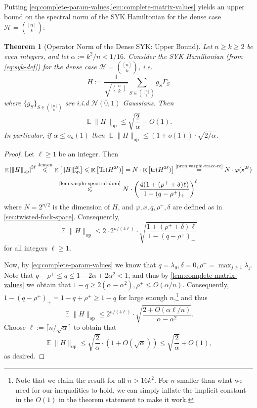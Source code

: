 \documentclass
[11pt,letterpaper]
{article}
\newtheorem{theorem}{Theorem}[section]
\theoremstyle{definition}
\newcommand{\cN}{\mathcal{N}}
\newcommand{\Tr}{\operatorname{Tr}}
\newcommand{\sfx}{\mathsf x}
\newcommand{\1}{\mathbf{1}}
\newcommand{\tr}{\mathrm{tr}}
\newcommand{\cH}{\mathcal H}
\DeclareMathOperator*{\E}{\mathbb{E}}
\renewcommand{\geq}{\geqslant}
\renewcommand{\leq}{\leqslant}
\begin{document}
Putting \cref{eq:complete-param-values,lem:complete-matrix-values} yields an upper bound on the spectral norm of the SYK Hamiltonian for the dense case $\cH = \binom{[n]}{k}$:
\begin{theorem}[Operator Norm of the Dense SYK: Upper Bound]\label{thm:syk-spectral-norm}
    Let $n\geq k\geq 2$ be even integers, and let $\alpha:= k^2/n < 1/16$. Consider the SYK Hamiltonian (from \cref{eq:syk-def}) for the dense case $\cH = \binom{[n]}{k}$, i.e.
    \[H:= \frac{1}{\sqrt{\binom{n}{k}}}\sum_{S\in\binom{[n]}{k}}g_S\Gamma_S\]
    where $\{g_S\}_{S\in\binom{[n]}{k}}$ are i.i.d $\cN(0, 1)$ Gaussians. Then 
    \[\E\|H\|_{\operatorname{op}}\leq \sqrt{\frac{2}{\alpha}} + O(1).\]
    In particular, if $\alpha\leq o_n(1)$ then $\E\|H\|_{\operatorname{op}}\leq (1 + o(1))\cdot\sqrt{2/\alpha}$.
\end{theorem}
\begin{proof}
    Let $\ell\geq 1$ be an integer. Then 
    \[\E\left[\|H\|_{\operatorname{op}}\right]^{2\ell}\overset{\text{Jensen}}{\leq}\E\left[\|H\|_{\operatorname{op}}^{2\ell}\right]\leq\E\left[\Tr(H^{2\ell})\right] = N\cdot\E\left[\tr(H^{2\ell})\right]\overset{\text{\cref{prop:varphi-trace-re}}}{=} N\cdot\varphi(\sfx^{2\ell})\] 
    \[\overset{\text{\cref{lem:varphi-spectral-dom}}}{\leq} N\cdot\left(\frac{4(1 + (\rho^+ + \delta)\ell)}{1 - (q - \rho^+)_+}\right)^\ell\]
    where $N = 2^{n/2}$ is the dimension of $H$, and $\varphi, x, q, \rho^+, \delta$ are defined as in \cref{sec:twisted-fock-space}. Consequently, 
    \[\E\|H\|_{\operatorname{op}}\leq 2\cdot 2^{n/(4\ell)}\cdot\sqrt{\frac{1 + (\rho^+ + \delta)\ell}{1 - (q - \rho^+)_+}}\]
    for all integers $\ell\geq 1$. 
    
    Now, by \cref{eq:complete-param-values} we know that $q = \lambda_0, \delta = 0, \rho^+ = \max_{j\geq 1}\lambda_j$. Note that $q - \rho^+\leq q\leq 1 - 2\alpha + 2\alpha^2 < 1$, and thus by \cref{lem:complete-matrix-values} we obtain that $1 - q\geq 2(\alpha - \alpha^2), \rho^+\leq O(\alpha/n)$. Consequently, $1 - (q - \rho^+)_+ = 1 - q + \rho^+\geq 1 - q$ for large enough $n$,\footnote{Note that we claim the result for all $n > 16k^2$. For $n$ smaller than what we need for our inequalities to hold, we can simply inflate the implicit constant in the $O(1)$ in the theorem statement to make it work.} and thus
    \[\E\|H\|_{\operatorname{op}}\leq 2^{n/(4\ell)}\cdot\sqrt{\frac{2 + O(\alpha\ell/n)}{\alpha - \alpha^2}}.\]
    Choose $\ell := \lceil n/\sqrt{\alpha}\rceil$ to obtain that 
    \[\E\|H\|_{\operatorname{op}}\leq \sqrt{\frac{2}{\alpha}}\cdot \left(1 + O(\sqrt{\alpha})\right) \leq \sqrt{\frac{2}{\alpha}} + O(1),\]
    as desired.
\end{proof}
\end{document}
